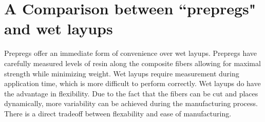 \documentclass{article}
\begin{document}
\section{A Comparison between ``prepregs" and wet layups}
Prepregs offer an immediate form of convenience over wet layups. Prepregs have carefully measured levels of resin along the composite fibers allowing for maximal strength while minimizing weight. Wet layups require measurement during application time, which is more difficult to perform correctly. Wet layups do have the advantage in flexibility. Due to the fact that the fibers can be cut and places dynamically, more variability can be achieved during the manufacturing process. There is a direct tradeoff between flexability and ease of manufacturing.
\end{document}
